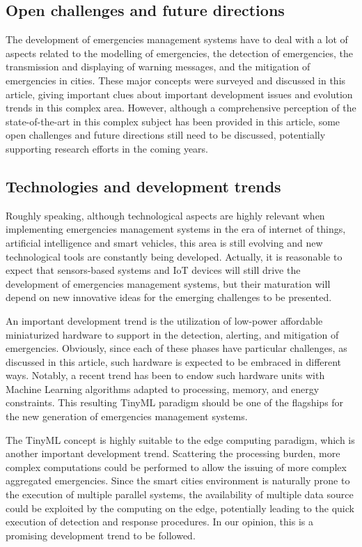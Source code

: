\begin{refsection}
\section{Open challenges and future directions}
\label{sec7}

The development of emergencies management systems have to deal with a lot of aspects related to the modelling of emergencies, the detection of emergencies, the transmission and displaying of warning messages, and the mitigation of emergencies in cities. These major concepts were surveyed and discussed in this article, giving important clues about important development issues and evolution trends in this complex area. However, although a comprehensive perception of the state-of-the-art in this complex subject has been provided in this article, some open challenges and future directions still need to be discussed, potentially supporting research efforts in the coming years.

\subsection{Technologies and development trends}

Roughly speaking, although technological aspects are highly relevant when implementing emergencies management systems in the era of internet of things, artificial intelligence and smart vehicles, this area is still evolving and new technological tools are constantly being developed. Actually, it is reasonable to expect that sensors-based systems and IoT devices will still drive the development of emergencies management systems, but their maturation will depend on new innovative ideas for the emerging challenges to be presented.

An important development trend is the utilization of low-power affordable miniaturized hardware to support in the detection, alerting, and mitigation of emergencies. Obviously, since each of these phases have particular challenges, as discussed in this article, such hardware is expected to be embraced in different ways. Notably, a recent trend has been to endow such hardware units with Machine Learning algorithms adapted to processing, memory, and energy constraints. This resulting TinyML paradigm should be one of the flagships for the new generation of emergencies management systems. 

The TinyML concept is highly suitable to the edge computing paradigm, which is another important development trend. Scattering the processing burden, more complex computations could be performed to allow the issuing of more complex aggregated emergencies. Since the smart cities environment is naturally prone to the execution of multiple parallel systems, the availability of multiple data source could be exploited by the computing on the edge, potentially leading to the quick execution of detection and response procedures. In our opinion, this is a promising development trend to be followed.


\end{refsection}
